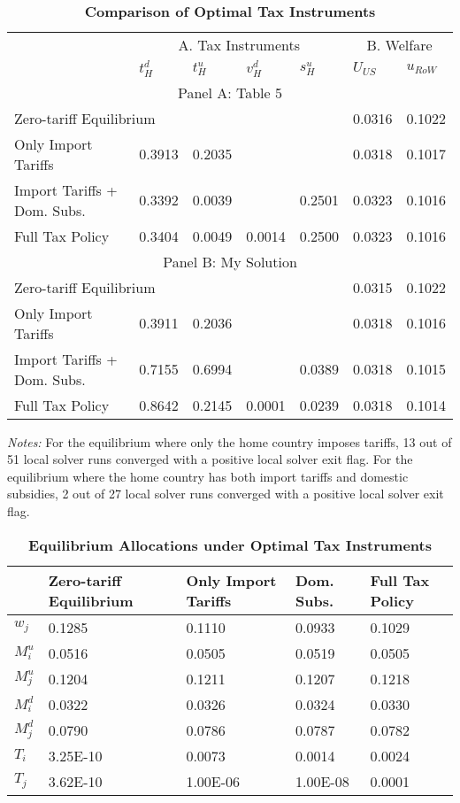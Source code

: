 \documentclass{homeworg}
\begin{document}
\begin{table}[H]
\caption{\textbf{Comparison of Optimal Tax Instruments}}
\label{tab:opt_tax}
\begin{tabular}{lllllll}
\hline\hline
& \multicolumn{4}{c}{A. Tax Instruments} & \multicolumn{2}{c}{B. Welfare} \\
& $t^{d}_{H}$ & $t^{u}_{H}$ & $v^{d}_{H}$ & $s^{u}_{H}$ & $U_{US}$ & $u_{RoW}$ \\
\hline
\multicolumn{7}{c}{Panel A: Table 5} \\
\multicolumn{2}{l}{Zero-tariff Equilibrium} & & & & 0.0316 & 0.1022 \\
Only Import Tariffs & 0.3913 & 0.2035 & & & 0.0318 & 0.1017 \\
Import Tariffs + Dom. Subs. & 0.3392 & 0.0039 & & 0.2501 & 0.0323 & 0.1016 \\
Full Tax Policy & 0.3404 & 0.0049 & 0.0014 & 0.2500 & 0.0323 & 0.1016 \\
\multicolumn{7}{c}{Panel B: My Solution} \\
\multicolumn{2}{l}{Zero-tariff Equilibrium} & & & & 0.0315 & 0.1022 \\
Only Import Tariffs & 0.3911 & 0.2036 & & & 0.0318 & 0.1016 \\
Import Tariffs + Dom. Subs. & 0.7155 & 0.6994 & & 0.0389 & 0.0318 & 0.1015 \\
Full Tax Policy & 0.8642 & 0.2145 & 0.0001 & 0.0239 & 0.0318 & 0.1014 \\
\hline\hline      
\end{tabular}
\begin{flushleft}
\scriptsize{\textit{Notes:} For the equilibrium where only the home country imposes tariffs, 13 out of 51 local solver runs converged with a positive local solver exit flag. For the equilibrium where the home country has both import tariffs and domestic subsidies, 2 out of 27 local solver runs converged with a positive local solver exit flag.}
\end{flushleft}
\end{table}

\begin{table}[H]
\caption{\textbf{Equilibrium Allocations under Optimal Tax Instruments}}
\label{tab:eqlm_tax}
\begin{tabular}{lllll}
\hline\hline
 & Zero-tariff Equilibrium & Only Import Tariffs & Dom. Subs. & Full Tax Policy \\
\hline
$w_j$ & 0.1285 & 0.1110 & 0.0933 & 0.1029 \\
$M^{u}_{i}$ & 0.0516 & 0.0505 & 0.0519 & 0.0505 \\
$M^{u}_{j}$ & 0.1204 & 0.1211 & 0.1207 & 0.1218 \\
$M^{d}_{i}$ & 0.0322 & 0.0326 & 0.0324 & 0.0330 \\
$M^{d}_{j}$ & 0.0790 & 0.0786 & 0.0787 & 0.0782 \\
$T_{i}$ & 3.25E-10 & 0.0073 & 0.0014 & 0.0024 \\
$T_{j}$ & 3.62E-10 & 1.00E-06 & 1.00E-08 & 0.0001 \\
\hline\hline     
\end{tabular}
\end{table}
\end{document}
